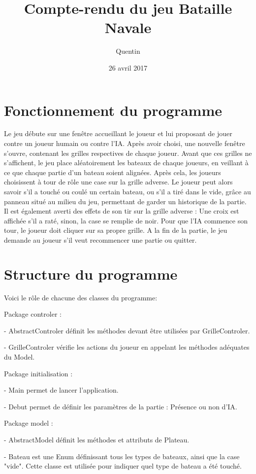 \documentclass{report}
\title{Compte-rendu du jeu Bataille Navale}
\author{Quentin \bsc{SAUVAGE}}
\date{26 avril 2017}
\begin{document}
\maketitle
\chapter{Fonctionnement du programme}
Le jeu débute sur une fenêtre accueillant le joueur et lui proposant de jouer contre un joueur humain ou contre l'IA. Après avoir choisi, une nouvelle fenêtre s'ouvre, contenant les grilles respectives de chaque joueur. Avant que ces grilles ne s'affichent, le jeu place aléatoirement les bateaux de chaque joueurs, en veillant à ce que chaque partie d'un bateau soient alignées. Après cela, les joueurs choisissent à tour de rôle une case sur la grille adverse. Le joueur peut alors savoir s'il a touché ou coulé un certain bateau, ou s'il a tiré dans le vide, grâce au panneau situé au milieu du jeu, permettant de garder un historique de la partie. Il est également averti des effets de son tir sur la grille adverse : Une croix est affichée s'il a raté, sinon, la case se remplie de noir. Pour que l'IA commence son tour, le joueur doit cliquer sur sa propre grille. A la fin de la partie, le jeu demande au joueur s'il veut recommencer une partie ou quitter.

\chapter{Structure du programme}

Voici le rôle de chacune des classes du programme:

\medbreak
Package controler :

- AbstractControler définit les méthodes devant être utilisées par GrilleControler.

- GrilleControler vérifie les actions du joueur en appelant les méthodes adéquates du Model.

\medbreak
Package initialisation :

- Main permet de lancer l'application.

- Debut permet de définir les paramètres de la partie : Présence ou non d'IA.

\medbreak
Package model :

- AbstractModel définit les méthodes et attributs de Plateau.

- Bateau est une Enum définissant tous les types de bateaux, ainsi que la case "vide". Cette classe est utilisée pour indiquer quel type de bateau a été touché.
\end{document}
